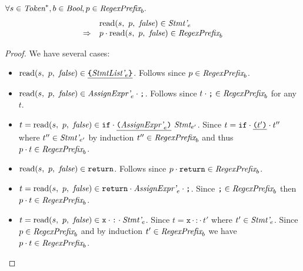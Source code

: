 \documentclass[preprint,10pt]{sigplanconf}
\begin{document}
\begin{lemma}\mbox{}

  \( \forall s \in \textit{Token}^*, b \in \textit{Bool}, p \in \textit{RegexPrefix}_b. \)
  \[
  \begin{array}{rl}
  &\textrm{read}(s,~p,~\textit{false}) \in \textit{Stmt'}_{e} 
  \\
  \Rightarrow& p \cdot \textrm{read}(s,~p,~\textit{false}) \in \textit{RegexPrefix}_b
  \end{array}
  \]
\end{lemma}
\begin{proof}
  We have several cases:
  \begin{itemize}
  \item \( \textrm{read}(s,~p,~\textit{false}) \in \underline{ \texttt{\{} \textit{StmtList'}_{e} \texttt{\}} }
    \). Follows since \( p \in \textit{RegexPrefix}_b \).

  \item \( \textrm{read}(s,~p,~\textit{false}) \in \textit{AssignExpr'}_{e} \cdot \texttt{;}
    \). Follows since \( t \cdot \texttt{;} \in \textit{RegexPrefix}_b \) for any
    \( t \).
    
  \item \( t = \textrm{read}(s,~p,~\textit{false}) \in \texttt{if}\cdot \underline{ \texttt{(} \textit{AssignExpr'}_{e} \texttt{)}}~\textit{Stmt}_{e'} \). Since
    \( t = \texttt{if}\cdot \underline{ \texttt{(} t' \texttt{)}}\cdot t'' \) where \( t'' \in
    \textit{Stmt'}_{e'} \) by induction \( t'' \in \textit{RegexPrefix}_b \) and
    thus \( p \cdot t \in \textit{RegexPrefix}_b \).

  \item \( \textrm{read}(s,~p,~\textit{false}) \in \texttt{return} \).
    Follows since \( p \cdot \texttt{return} \in \textit{RegexPrefix}_b \).
    
  \item \( t = \textrm{read}(s,~p,~\textit{false}) \in
    \texttt{return}\cdot\textit{AssignExpr'}_{e}\cdot \texttt{;} \). 
    Since \( \texttt{;} \in \textit{RegexPrefix}_b \) then \( p \cdot t \in
    \textit{RegexPrefix}_b \).

  \item \( t = \textrm{read}(s,~p,~\textit{false}) \in
    \texttt{x} \cdot \texttt{:} \cdot \textit{Stmt'}_{e} \). Since \( t = \texttt{x}\cdot
    \texttt{:}\cdot t' \) where \( t' \in \textit{Stmt'}_{e} \). Since
    \( p \in \textit{RegexPrefix}_b \) and by induction \( t' \in \textit{RegexPrefix}_b \) we
    have \( p \cdot t \in \textit{RegexPrefix}_b \).

  \end{itemize}
\end{proof}
\end{document}
